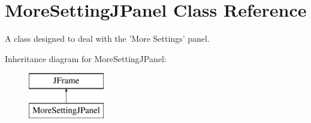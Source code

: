 \hypertarget{class_more_setting_j_panel}{\section{More\-Setting\-J\-Panel Class Reference}
\label{class_more_setting_j_panel}
}


A class designed to deal with the 'More Settings' panel.  


Inheritance diagram for More\-Setting\-J\-Panel\-:\begin{figure}[H]
\begin{center}
\leavevmode
\includegraphics[height=2.000000cm]{class_more_setting_j_panel}
\end{center}
\end{figure}
